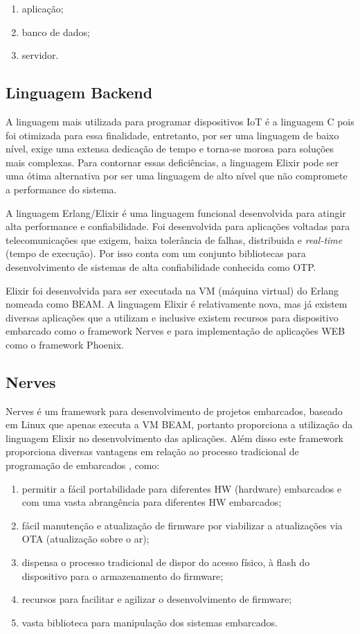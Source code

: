 \documentclass[../../layout.tex]{subfiles}
\begin{document}
\begin{enumerate}[label=\alph*)]
\itemsep0em
    \item aplicação;
    \item banco de dados;
    \item servidor.
\end{enumerate}

\subsection{Linguagem Backend}
\hspace*{3em}A linguagem mais utilizada para programar dispositivos IoT é a linguagem C pois foi otimizada para essa finalidade, entretanto, por ser uma linguagem de baixo nível, exige uma extensa dedicação de tempo e torna-se morosa para soluções mais complexas. Para contornar essas deficiências, a linguagem Elixir pode ser uma ótima alternativa por ser uma linguagem de alto nível que não compromete a performance do sistema.\par
A linguagem Erlang/Elixir é uma linguagem funcional desenvolvida para atingir alta performance e confiabilidade. Foi desenvolvida para aplicações voltadas para telecomunicações que exigem, baixa tolerância de falhas, distribuida e \emph{real-time} (tempo de execução). Por isso conta com um conjunto bibliotecas para desenvolvimento de sistemas de alta confiabilidade conhecida como OTP.\par
Elixir foi desenvolvida para ser executada na VM (máquina virtual) do Erlang nomeada como BEAM. A linguagem Elixir é relativamente nova, mas já existem diversas aplicações que a utilizam e inclusive existem recursos para dispositivo embarcado como o framework Nerves \cite{ElixirorIoT} e para implementação de aplicações WEB como o framework Phoenix.

\subsection{Nerves}
\hspace*{3em}Nerves é um framework para desenvolvimento de projetos embarcados, baseado em Linux que apenas executa a VM BEAM, portanto proporciona a utilização da linguagem Elixir no desenvolvimento das aplicações. Além disso este framework proporciona diversas vantagens em relação ao processo tradicional de programação de embarcados \cite{nerves}, como:
\begin{enumerate}[label=\alph*)]
\itemsep0em
    \item permitir a fácil portabilidade para diferentes HW (hardware) embarcados e com uma vasta abrangência para diferentes HW embarcados;
    \item fácil manutenção e atualização de firmware por viabilizar a atualizações via OTA (atualização sobre o ar);
    \item dispensa o processo tradicional de dispor do acesso físico, à flash do dispositivo para o armazenamento do firmware;
    \item recursos para facilitar e agilizar o desenvolvimento de firmware;
    \item vasta biblioteca para manipulação dos sistemas embarcados.
\end{enumerate}
\end{document}
